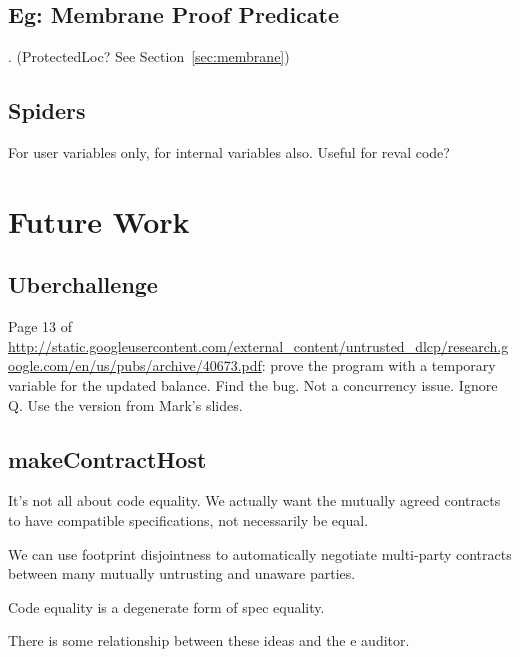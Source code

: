 \documentclass[a4paper]{article}
\begin{document}
\subsection{Eg: Membrane Proof Predicate}
. (ProtectedLoc? See Section~\ref{sec:membrane})
\subsection{Spiders}

For user variables only, for internal variables also. Useful for reval code?

\section{Future Work}
\subsection{Uberchallenge}
Page 13 of
  \url{http://static.googleusercontent.com/external_content/untrusted_dlcp/research.google.com/en/us/pubs/archive/40673.pdf}:
  prove the program with a temporary variable for the updated balance. Find the
  bug.  Not a concurrency issue. Ignore Q. Use the version from Mark's slides.

\subsection{makeContractHost}
      It's not all about code equality. We actually want the mutually
      agreed contracts to have compatible specifications, not
      necessarily be equal.

      We can use footprint disjointness to automatically negotiate
      multi-party contracts between many mutually untrusting and
      unaware parties.

      Code equality is a degenerate form of spec equality.

      There is some relationship between these ideas and the e
      auditor.



\end{document}
